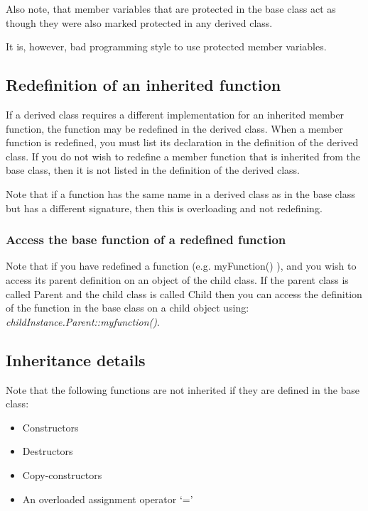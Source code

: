 Also note, that member variables that are protected in the base class act as though they
were also marked protected in any derived class.

It is, however, bad programming style to use protected member variables.




\subsection{Redefinition of an inherited function}
If a derived class requires a different implementation for an inherited member function, the
function may be redefined in the derived class. When a member function is redefined, you
must list its declaration in the definition of the derived class. If you do not wish to redefine a
member function that is inherited from the base class, then it is not listed in the definition of
the derived class.

Note that if a function has the same name in a derived class as in the base class but has 
a different signature, then this is overloading and not redefining.

\subsubsection*{Access the base function of a redefined function}
Note that if you have redefined a function (e.g. myFunction() ), and you wish to access
its parent definition on an object of the child class. If the parent class is called Parent and
the child class is called Child then you can access the definition of the function in the base
class on a child object using: \emph{childInstance.Parent::myfunction()}.





\subsection{Inheritance details}
Note that the following functions are not inherited if they are defined in the base class:
\begin{itemize}
	\item Constructors
	\item Destructors
	\item Copy-constructors
	\item An overloaded assignment operator `='
\end{itemize}


